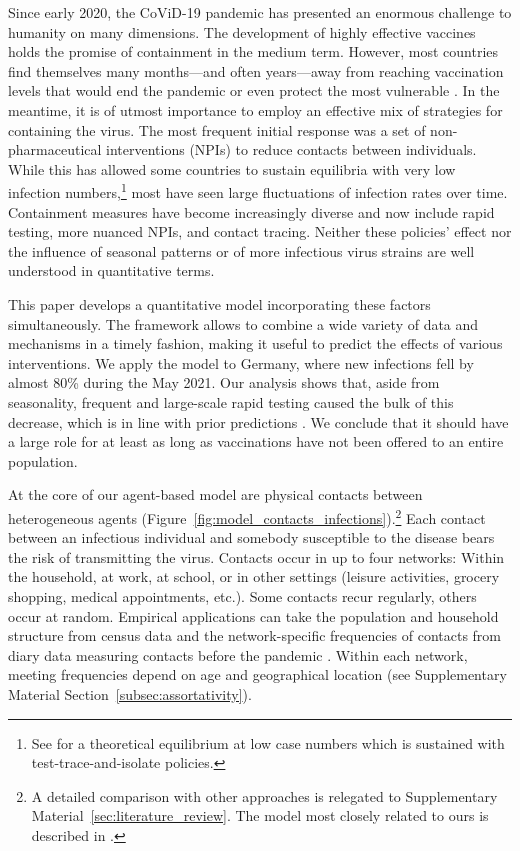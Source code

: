 Since early 2020, the CoViD-19 pandemic has presented an enormous challenge to humanity
on many dimensions. The development of highly effective vaccines holds the promise of
containment in the medium term. However, most countries find themselves many
months---and often years---away from reaching vaccination levels that would end the
pandemic or even protect the most vulnerable \citep{Mathieu2021}. In the meantime, it is
of utmost importance to employ an effective mix of strategies for containing the virus.
The most frequent initial response was a set of non-pharmaceutical interventions (NPIs)
to reduce contacts between individuals. While this has allowed some countries to sustain
equilibria with very low infection numbers,\footnote{See \citet{Contreras2021} for a
theoretical equilibrium at low case numbers which is sustained with
test-trace-and-isolate policies.} most have seen large fluctuations of infection rates
over time. Containment measures have become increasingly diverse and now include rapid
testing, more nuanced NPIs, and contact tracing. Neither these policies' effect nor the
influence of seasonal patterns or of more infectious virus strains are well understood
in quantitative terms.

This paper develops a quantitative model incorporating these factors simultaneously. The
framework allows to combine a wide variety of data and mechanisms in a timely fashion,
making it useful to predict the effects of various interventions. We apply the model to
Germany, where new infections fell by almost 80\% during the May 2021. Our analysis shows
that, aside from seasonality, frequent and large-scale rapid testing caused the bulk of
this decrease, which is in line with prior predictions \citep{Mina2021}. We conclude that
it should have a large role for at least as long as vaccinations have not been offered to
an entire population.

At the core of our agent-based model are physical contacts between heterogeneous agents
(Figure~\ref{fig:model_contacts_infections}).\footnote{A detailed comparison with other
approaches  is relegated to Supplementary Material~\ref{sec:literature_review}. The model
most closely related to ours is described in \citet{Hinch2020}.} Each contact between an
infectious individual and somebody susceptible to the disease bears the risk of
transmitting the virus. Contacts occur in up to four networks: Within the household, at work,
at school, or in other settings (leisure activities, grocery shopping, medical
appointments, etc.). Some contacts recur regularly, others occur at random. Empirical
applications can take the population and household structure from census data and the
network-specific frequencies of contacts from diary data measuring contacts before the
pandemic \citep[e.g.][]{Mossong2008,Hoang2019}. Within each network, meeting frequencies
depend on age and geographical location (see Supplementary Material
Section~\ref{subsec:assortativity}).

